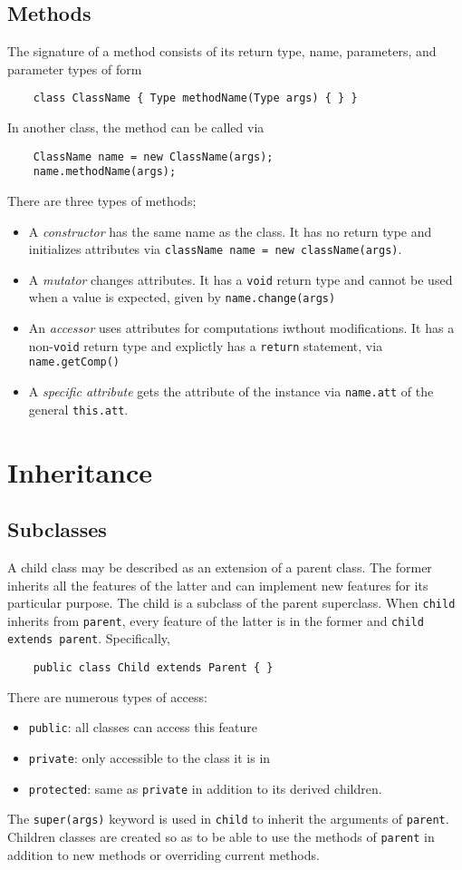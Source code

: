 \documentclass[letterpaper, openany, justified]{tufte-book}
\newcommand{\cd}[1]{\lstinline{#1}}
\begin{document}
\begin{fullwidth}
\section{Methods}
The signature of a method consists of its return type, name, parameters, and parameter types of form
\begin{lstlisting}
    class ClassName { Type methodName(Type args) { } }
\end{lstlisting}
In another class, the method can be called via
\begin{lstlisting}
    ClassName name = new ClassName(args);
    name.methodName(args);
\end{lstlisting}
There are three types of methods;
\begin{itemize}
    \item A \emph{constructor} has the same name as the class. It has no return type and initializes attributes via \cd{className name = new className(args)}.
    \item A \emph{mutator} changes attributes. It has a \cd{void} return type and cannot be used when a value is expected, given by \cd{name.change(args)}
    \item An \emph{accessor} uses attributes for computations iwthout modifications. It has a non-\cd{void} return type and explictly has a \cd{return} statement, via \cd{name.getComp()}
    \item A \emph{specific attribute} gets the attribute of the instance via \cd{name.att} of the general \cd{this.att}.
\end{itemize}

\chapter{Inheritance}

\section{Subclasses}
A child class may be described as an extension of a parent class. The former inherits all the features of the latter and can implement new features for its particular purpose. The child is a subclass of the parent superclass. When \cd{child} inherits from \cd{parent}, every feature of the latter is in the former and \cd{child extends parent}. Specifically,
\begin{lstlisting}
    public class Child extends Parent { }
\end{lstlisting}
There are numerous types of access:
\begin{itemize}
    \item \cd{public}: all classes can access this feature
    \item \cd{private}: only accessible to the class it is in
    \item \cd{protected}: same as \cd{private} in addition to its derived children.
\end{itemize}
The \cd{super(args)} keyword is used in \cd{child} to inherit the arguments of \cd{parent}. Children classes are created so as to be able to use the methods of \cd{parent} in addition to new methods or overriding current methods.


\end{fullwidth}
\end{document}
